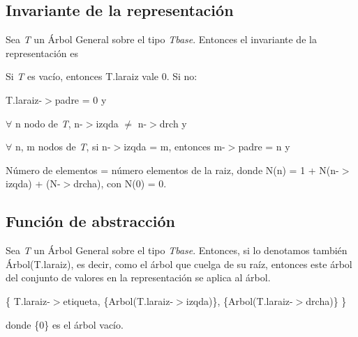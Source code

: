 \hypertarget{repConjunto_invConjunto}{}\subsection{Invariante de la representación}\label{repConjunto_invConjunto}
Sea {\itshape T} un Árbol General sobre el tipo {\itshape Tbase}. Entonces el invariante de la representación es

Si {\itshape T} es vacío, entonces T.\+laraiz vale 0. Si no\+:
\begin{DoxyItemize}
\item T.\+laraiz-\/$>$padre = 0 y
\item $ \forall $ n nodo de {\itshape T}, n-\/$>$izqda $ \neq $ n-\/$>$drch y
\item $ \forall $ n, m nodos de {\itshape T}, si n-\/$>$izqda = m, entonces m-\/$>$padre = n y
\item Número de elementos = número elementos de la raiz, donde N(n) = 1 + N(n-\/$>$izqda) + (N-\/$>$drcha), con N(0) = 0.
\end{DoxyItemize}\hypertarget{repConjunto_faConjunto}{}\subsection{Función de abstracción}\label{repConjunto_faConjunto}
Sea {\itshape T} un Árbol General sobre el tipo {\itshape Tbase}. Entonces, si lo denotamos también Árbol(T.\+laraiz), es decir, como el árbol que cuelga de su raíz, entonces este árbol del conjunto de valores en la representación se aplica al árbol.

\{ T.\+laraiz-\/$>$etiqueta, \{Arbol(T.\+laraiz-\/$>$izqda)\}, \{Arbol(T.\+laraiz-\/$>$drcha)\} \}

donde \{0\} es el árbol vacío. 